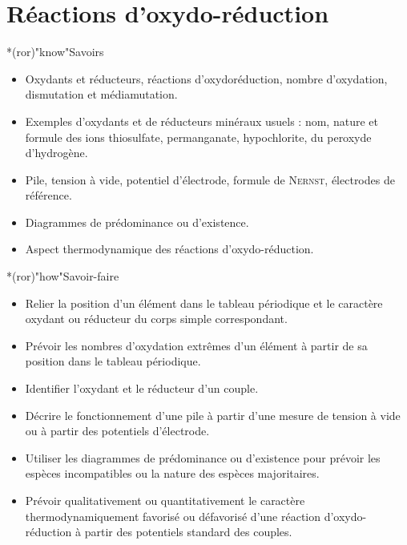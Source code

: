 \documentclass[../../main/main.tex]{subfiles}
\begin{document}
\setcounter{chapter}{5}


\chapter{R\'eactions d'oxydo-r\'eduction}

\vspace*{\fill}

\begin{prgm}
	\small
	\begin{tcb}*(ror)"know"{Savoirs}
		\begin{itemize}
			\item Oxydants et réducteurs, réactions d'oxydoréduction, nombre
			      d'oxydation, dismutation et médiamutation.
			\item Exemples d'oxydants et de réducteurs minéraux usuels : nom, nature
			      et formule des ions thiosulfate, permanganate, hypochlorite, du
			      peroxyde d'hydrogène.
			\item Pile, tension à vide, potentiel d'électrode, formule de
			      \textsc{Nernst}, électrodes de référence.
			\item Diagrammes de prédominance ou d'existence.
			\item Aspect thermodynamique des réactions d'oxydo-réduction.
		\end{itemize}
	\end{tcb}
	\begin{tcb}*(ror)"how"{Savoir-faire}
		\begin{itemize}
			\item Relier la position d'un élément dans le tableau périodique et le
			      caractère oxydant ou réducteur du corps simple correspondant.

			\item Prévoir les nombres d'oxydation extrêmes d'un élément à partir de sa
			      position dans le tableau périodique.

			\item Identifier l'oxydant et le réducteur d'un couple.

			\item Décrire le fonctionnement d'une pile à partir d'une mesure de
			      tension à vide ou à partir des potentiels d'électrode.

			\item Utiliser les diagrammes de prédominance ou d'existence pour prévoir
			      les espèces incompatibles ou la nature des espèces majoritaires.

			\item Prévoir qualitativement ou quantitativement le caractère
			      thermodynamiquement favorisé ou défavorisé d'une réaction
			      d'oxydo-réduction à partir des potentiels standard des couples.
		\end{itemize}
	\end{tcb}
\end{prgm}
\end{document}
